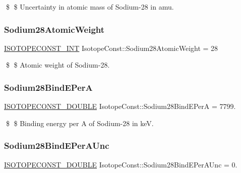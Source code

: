 \$ \$ Uncertainty in atomic mass of Sodium-\/28 in amu. \mbox{\label{group___isotope_const-_sodium-_na28_ga6bd7bc8ceaffc359e72d709599c07f45}} 
\subsubsection{\texorpdfstring{Sodium28\+Atomic\+Weight}{Sodium28AtomicWeight}}
{\footnotesize\ttfamily \mbox{\hyperlink{group___isotope_const-_macros_ga5f18360b3e99483a35c32d789e62621c}{I\+S\+O\+T\+O\+P\+E\+C\+O\+N\+S\+T\+\_\+\+I\+NT}} Isotope\+Const\+::\+Sodium28\+Atomic\+Weight = 28}

\$ \$ Atomic weight of Sodium-\/28. \mbox{\label{group___isotope_const-_sodium-_na28_gaf8c2f7eab65bbd31000e6c9b63b5fbed}} 
\subsubsection{\texorpdfstring{Sodium28\+Bind\+E\+PerA}{Sodium28BindEPerA}}
{\footnotesize\ttfamily \mbox{\hyperlink{group___isotope_const-_macros_ga8f45a7272ce02c0b4c65c44636ed719a}{I\+S\+O\+T\+O\+P\+E\+C\+O\+N\+S\+T\+\_\+\+D\+O\+U\+B\+LE}} Isotope\+Const\+::\+Sodium28\+Bind\+E\+PerA = 7799.}

\$ \$ Binding energy per A of Sodium-\/28 in keV. \mbox{\label{group___isotope_const-_sodium-_na28_gaece3115a33124a7cbd0dae4b4ee86216}} 
\subsubsection{\texorpdfstring{Sodium28\+Bind\+E\+Per\+A\+Unc}{Sodium28BindEPerAUnc}}
{\footnotesize\ttfamily \mbox{\hyperlink{group___isotope_const-_macros_ga8f45a7272ce02c0b4c65c44636ed719a}{I\+S\+O\+T\+O\+P\+E\+C\+O\+N\+S\+T\+\_\+\+D\+O\+U\+B\+LE}} Isotope\+Const\+::\+Sodium28\+Bind\+E\+Per\+A\+Unc = 0.}

